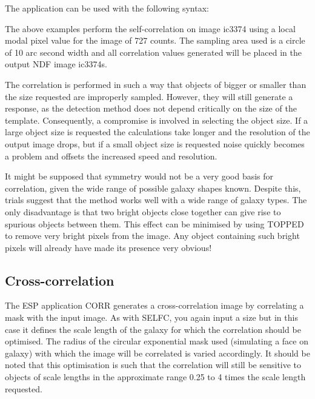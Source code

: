 \documentclass[twoside,11pt]{starlink}
\begin{document}
The application can be used with the following syntax:

\begin{terminalv}
\end{terminalv}

The above examples perform the self-correlation on image ic3374 using a local
modal pixel value for the image of 727 counts. The sampling area used is
a circle of 10 arc second width and all correlation values generated
will be placed in the output NDF image ic3374s.

The correlation is performed in such a way that objects of
bigger or smaller than the size requested are improperly sampled. However,
they will still generate a response, as the detection method does not depend
critically on the size of the template. Consequently, a compromise is
involved in selecting the object size. If a large object size is requested
the calculations take longer and the resolution of the output image drops,
but if a small object size is requested noise quickly
becomes a problem and offsets the increased speed and resolution.

It might be supposed that symmetry would not be a very good basis for correlation,
given the wide range of possible galaxy shapes known. Despite this,
trials suggest that the method works well with a wide range of galaxy
types. The only disadvantage is that two bright objects close together can
give rise to spurious objects between them. This effect can be minimised by
using TOPPED to remove very bright pixels from the image. Any object containing
such bright pixels will already have made its presence very obvious!

\subsection{Cross-correlation}

The ESP application CORR generates a cross-correlation image by correlating
a mask with the input image. As with SELFC, you again input a size but in
this case it defines the scale length of the galaxy for which the correlation
should be optimised. The radius of the circular exponential mask used
(simulating a face on galaxy) with which the image will be correlated
is varied accordingly. It should be noted that this optimisation is such that
the correlation will still be sensitive to objects of scale lengths in the
approximate range 0.25 to 4 times the scale length requested.
\end{document}

